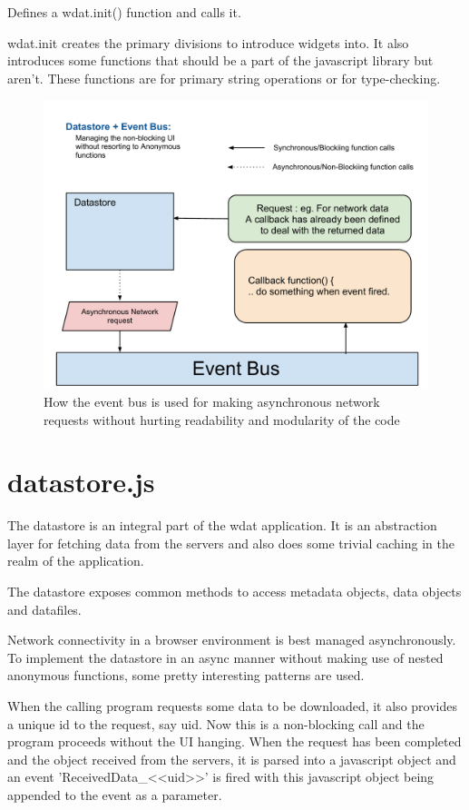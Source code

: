 Defines a wdat.init() function and calls it.

wdat.init creates the primary divisions to introduce widgets into. It
also introduces some functions that should be a part of the javascript
library but aren't.  These functions are for primary string operations
or for type-checking.

\begin{figure}[h!t]
  \centering
  \includegraphics[width=\textwidth]{src/images/DatastoreAndEventBus.pdf}
  \caption[EventBus + Datastore]{How the event bus is used for making asynchronous network
    requests without hurting readability and modularity of the code}
\end{figure}

\section{datastore.js}

The datastore is an integral part of the wdat application.  It is an
abstraction layer for fetching data from the servers and also does
some trivial caching in the realm of the application.  

The datastore exposes common methods to access metadata objects, data
objects and datafiles.  

Network connectivity in a browser environment is best managed
asynchronously.  To implement the datastore in an async manner without
making use of nested anonymous functions, some pretty interesting
patterns are used.

When the calling program requests some data to be downloaded, it also
provides a unique id to the request, say uid.  Now this is a
non-blocking call and the program proceeds without the UI hanging.
When the request has been completed and the object received from the
servers, it is parsed into a javascript object and an event
'ReceivedData\_<<uid>>' is fired with this javascript object being
appended to the event as a parameter.

